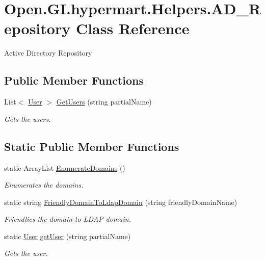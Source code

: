 \hypertarget{class_open_1_1_g_i_1_1hypermart_1_1_helpers_1_1_a_d___repository}{}\section{Open.\+G\+I.\+hypermart.\+Helpers.\+A\+D\+\_\+\+Repository Class Reference}
\label{class_open_1_1_g_i_1_1hypermart_1_1_helpers_1_1_a_d___repository}


Active Directory Repository  


\subsection*{Public Member Functions}
\begin{DoxyCompactItemize}
\item 
List$<$ \hyperlink{class_open_1_1_g_i_1_1hypermart_1_1_models_1_1_user}{User} $>$ \hyperlink{class_open_1_1_g_i_1_1hypermart_1_1_helpers_1_1_a_d___repository_acf1eb85047c96cf0925f10a7acd96859}{Get\+Users} (string partial\+Name)
\begin{DoxyCompactList}\small\item\em Gets the users. \end{DoxyCompactList}\end{DoxyCompactItemize}
\subsection*{Static Public Member Functions}
\begin{DoxyCompactItemize}
\item 
static Array\+List \hyperlink{class_open_1_1_g_i_1_1hypermart_1_1_helpers_1_1_a_d___repository_a648df6740e7c4c8b603bf8dac1c0d4a1}{Enumerate\+Domains} ()
\begin{DoxyCompactList}\small\item\em Enumerates the domains. \end{DoxyCompactList}\item 
static string \hyperlink{class_open_1_1_g_i_1_1hypermart_1_1_helpers_1_1_a_d___repository_a69769f94231c2d4347184f3b5d6a14a6}{Friendly\+Domain\+To\+Ldap\+Domain} (string friendly\+Domain\+Name)
\begin{DoxyCompactList}\small\item\em Friendlies the domain to L\+D\+A\+P domain. \end{DoxyCompactList}\item 
static \hyperlink{class_open_1_1_g_i_1_1hypermart_1_1_models_1_1_user}{User} \hyperlink{class_open_1_1_g_i_1_1hypermart_1_1_helpers_1_1_a_d___repository_ab3cdd5f9a962e26fcb50033a5dc4fc0f}{get\+User} (string partial\+Name)
\begin{DoxyCompactList}\small\item\em Gets the user. \end{DoxyCompactList}\end{DoxyCompactItemize}


